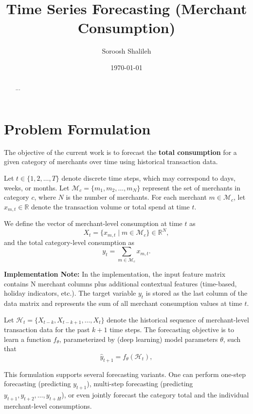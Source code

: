 \documentclass{article}
\title{Time Series Forecasting (Merchant Consumption)}
\author{Soroosh Shalileh}
\date{\today}
\begin{document}
\maketitle

\begin{abstract}
...
\end{abstract}


\section{Problem Formulation}

The objective of the current work is to forecast the \textbf{total consumption} for a given category of merchants over time using historical transaction data.


Let \( t \in \{1, 2, \dots, T\} \) denote discrete time steps, which may correspond to days, weeks, or months. Let \( \mathcal{M}_c = \{m_1, m_2, \dots, m_N\} \) represent the set of merchants in category \( c \), where \( N \) is the number of merchants. For each merchant \( m \in \mathcal{M}_c \), let \( x_{m,t} \in \mathbb{R} \) denote the transaction volume or total spend at time \( t \).

We define the vector of merchant-level consumption at time \( t \) as
\[
X_t = \{x_{m,t} \mid m \in \mathcal{M}_c\} \in \mathbb{R}^N,
\]
and the total category-level consumption as
\[
y_t = \sum_{m \in \mathcal{M}_c} x_{m,t}.
\]

\textbf{Implementation Note:} In the implementation, the input feature matrix contains N merchant columns plus additional contextual features (time-based, holiday indicators, etc.). The target variable \( y_t \) is stored as the last column of the data matrix and represents the sum of all merchant consumption values at time \( t \).


Let \( \mathcal{H}_t = \{X_{t-k}, X_{t-k+1}, \dots, X_t\} \) denote the historical sequence of merchant-level transaction data for the past \( k+1 \) time steps.
The forecasting objective is to learn a function \( f_\theta \), parameterized by (deep learning) model parameters \( \theta \), such that
\[
\hat{y}_{t+1} = f_\theta(\mathcal{H}_t),
\]



This formulation supports several forecasting variants. One can perform one-step forecasting (predicting \( y_{t+1} \)), multi-step forecasting (predicting \( y_{t+1}, y_{t+2}, \dots, y_{t+H} \)), or even jointly forecast the category total and the individual merchant-level consumptions.
\end{document}
